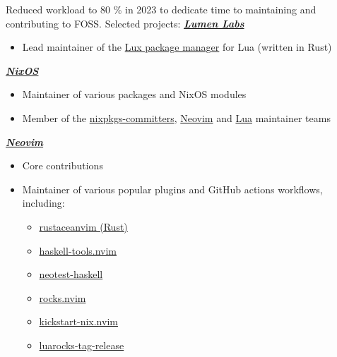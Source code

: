 \documentclass[11pt,a4paper,ngerman,sans]{moderncv}
\begin{document}
{
  Reduced workload to 80 \% in 2023 to dedicate time to maintaining and contributing to FOSS. Selected projects:
  \newline
  \newline
  \textbf{\emph{\href{https://opencollective.com/lumen-labs}{Lumen Labs}}}
  \begin{itemize}
    \item Lead maintainer of the \href{https://lux.lumen-labs.org}{Lux package manager} for Lua (written in Rust)
    \\
  \end{itemize}
  \textbf{\emph{\href{https://nixos.org/}{NixOS}}}
  \begin{itemize}
    \item Maintainer of various packages and NixOS modules
    \item Member of the \href{https://github.com/orgs/NixOS/teams/nixpkgs-committers}{nixpkgs-committers},
      \href{https://github.com/orgs/NixOS/teams/neovim}{Neovim} and \href{https://github.com/orgs/NixOS/teams/lua}{Lua} maintainer teams
    \\
  \end{itemize}
  \textbf{\emph{\href{https://neovim.io/}{Neovim}}}
  \begin{itemize}
    \item Core contributions
    \item Maintainer of various popular plugins and GitHub actions workflows, including:
      \begin{itemize}
        \item \href{https://github.com/mrcjkb/rustaceanvim}{rustaceanvim (Rust)}
        \item \href{https://github.com/mrcjkb/haskell-tools.nvim}{haskell-tools.nvim}
        \item \href{https://github.com/mrcjkb/neotest-haskell}{neotest-haskell}
        \item \href{https://github.com/nvim-neorocks/rocks.nvim}{rocks.nvim}
        \item \href{https://github.com/mrcjkb/kickstart-nix.nvim}{kickstart-nix.nvim}
        \item \href{https://github.com/nvim-neorocks/luarocks-tag-release}{luarocks-tag-release}\newline
      \end{itemize}
  \end{itemize}
}
{}
\end{document}
